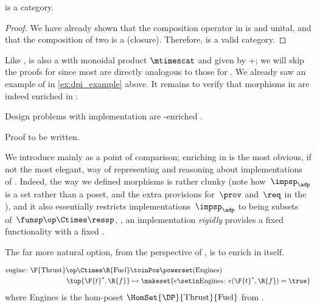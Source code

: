 \begin{lemma}
    \label{lem:DPI-is-category}
    \DPI is a category.
\end{lemma}

\begin{proof}
    We have already shown that the composition operator in \DPI is  and unital, and that the composition of two  is a  (closure).
    Therefore, \DPI is a valid category.
\end{proof}

Like \DP, \DPI is also a  with monoidal product $\mtimescat$ and  given by $+$;
we will skip the proofs for \DPI since most are directly analogous to those for \DP.
We already saw an example of \DPI in \cref{ex:dpi_example} above.
It remains to verify that morphisms in \DPI are indeed enriched in \Set:

\begin{proposition}
    Design problems with implementation are \Set-enriched .
\end{proposition}
\begin{publictodo}
    Proof to be written.
\end{publictodo}
We introduce \DPI mainly as a point of comparison; enriching in \Set is the most obvious, if not the most elegant, way of representing and reasoning about implementations of .
Indeed, the way we defined morphisms is rather clunky (note how~$\impsp_\adp$ is a set rather than a poset, and the extra provisions for~$\prov$ and~$\req$ in the ), and it also essentially restricts implementations~$\impsp_\adp$ to being subsets of~$\funsp\op \Ctimes \ressp$, \ie, an implementation \emph{rigidly} provides a fixed functionality \fun with a fixed \res.

The far more natural option, from the perspective of  , is to enrich  in \DP itself.

\begin{example}
    \begin{equation}
        \begin{aligned}
            \text{engine} \colon \F{\text{Thrust}}\op \Ctimes \R{\text{Fuel}} & \toinPos \powerset(\text{Engines}) \\
            \tup{\F{t}^*,\R{f}}                                               & \mapsto \makeset{ e \setin \text{Engines} \colon e(\F{t}^*, \R{f}) = \true }
        \end{aligned}
    \end{equation}
    where Engines is the hom-poset $\HomSet{\DP}{\text{Thrust}}{\text{Fuel}}$ from \XXX. %
\end{example}

